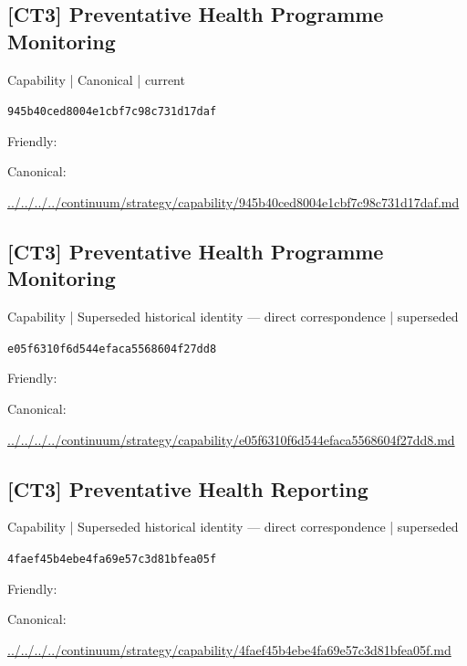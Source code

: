 \documentclass[10pt,a4paper]{article}
\begin{document}
\subsection*{[CT3] Preventative Health Programme Monitoring}
{\small Capability | Canonical | current}\par
\texttt{945b40ced8004e1cbf7c98c731d17daf}\par
Friendly: \par
Canonical: \par
{\footnotesize\url{../../../../continuum/strategy/capability/945b40ced8004e1cbf7c98c731d17daf.md}}\par
\subsection*{[CT3] Preventative Health Programme Monitoring}
{\small Capability | Superseded historical identity — direct correspondence | superseded}\par
\texttt{e05f6310f6d544efaca5568604f27dd8}\par
Friendly: \par
Canonical: \par
{\footnotesize\url{../../../../continuum/strategy/capability/e05f6310f6d544efaca5568604f27dd8.md}}\par
\subsection*{[CT3] Preventative Health Reporting}
{\small Capability | Superseded historical identity — direct correspondence | superseded}\par
\texttt{4faef45b4ebe4fa69e57c3d81bfea05f}\par
Friendly: \par
Canonical: \par
{\footnotesize\url{../../../../continuum/strategy/capability/4faef45b4ebe4fa69e57c3d81bfea05f.md}}\par
\end{document}
